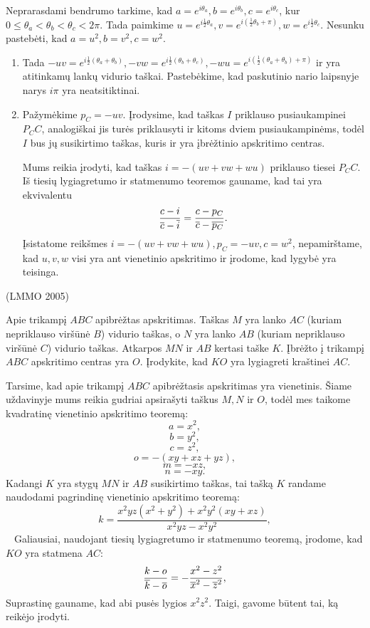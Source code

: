 \documentclass[11pt,a4paper,twoside]{book}
\begin{document}
\begin{sprendimas}
Neprarasdami bendrumo tarkime, kad $a=e^{i\theta_a}, b=e^{i\theta_b}, c=e^{i\theta_c}$, kur $0 \leq \theta_a < \theta_b < \theta_c < 2\pi$. Tada paimkime $u=e^{i\frac{1}{2}\theta_a}, v=e^{i(\frac{1}{2}\theta_b+\pi)}, w=e^{i\frac{1}{2}\theta_c}$. Nesunku pastebėti, kad $a=u^{2}, b=v^{2}, c=w^{2}$.

\begin{enumerate}
\item Tada $-uv=e^{i\frac{1}{2}(\theta_a+\theta_b)}, -vw=e^{i\frac{1}{2}(\theta_b+\theta_c)}, -wu=e^{i(\frac{1}{2}(\theta_a+\theta_b)+\pi)}$ ir yra atitinkamų lankų vidurio taškai. Pastebėkime, kad paskutinio nario laipsnyje narys $i\pi$ yra neatsitiktinai.
\item Pažymėkime $p_C=-uv$. Įrodysime, kad taškas $I$ priklauso pusiaukampinei $P_CC$, analogiškai jis turės priklausyti ir kitoms dviem pusiaukampinėms, todėl $I$ bus jų susikirtimo taškas, kuris ir yra įbrėžtinio apskritimo centras.

Mums reikia įrodyti, kad taškas $i=-(uv+vw+wu)$ priklauso tiesei $P_CC$. Iš tiesių lygiagretumo ir statmenumo teoremos gauname, kad tai yra ekvivalentu $$\frac{c-i}{\overline c - \overline i}=\frac{c-p_C}{\overline {c} - \overline {p_C}}.$$
Įsistatome reikšmes $i=-(uv+vw+wu), p_C=-uv, c=w^2$, nepamirštame, kad $u, v, w$ visi yra ant vienetinio apskritimo ir įrodome, kad lygybė yra teisinga.
\end{enumerate}
\end{sprendimas}






\begin{pavnr}
(LMMO 2005)

Apie trikampį $ABC$ apibrėžtas apskritimas. Taškas $M$ yra lanko $AC$ (kuriam nepriklauso viršūnė $B$) vidurio taškas, o $N$ yra lanko $AB$ (kuriam nepriklauso viršūnė $C$) vidurio taškas. Atkarpos $MN$ ir $AB$ kertasi taške $K$. Įbrėžto į trikampį $ABC$ apskritimo centras yra $O$. Įrodykite, kad $KO$ yra lygiagreti kraštinei $AC$. 
\end{pavnr}
\begin{sprendimas}
Tarsime, kad apie trikampį $ABC$ apibrėžtasis apskritimas yra vienetinis. Šiame uždavinyje mums reikia gudriai apsirašyti taškus $M, N$ ir $O$, todėl mes taikome kvadratinę vienetinio apskritimo teoremą:
$$a = x^2,$$
$$b=y^2,$$
$$c = z^2,$$
$$ o = - (xy+xz+yz),$$
$$m = - xz,$$
$$ n = - xy.$$
Kadangi $K$ yra stygų $MN$ ir $AB$ susikirtimo taškas, tai tašką $K$ randame naudodami pagrindinę vienetinio apskritimo teoremą:
$$k = \frac{ x^2yz(x^2+y^2)+ x^2 y^2 (xy+xz)}{ x^2 yz - x^2 y^2},$$
$\phantom{a}$ 
Galiausiai, naudojant tiesių lygiagretumo ir statmenumo teoremą, įrodome, kad $KO$ yra statmena $AC$:
$$\frac{k-o}{\overline k - \overline o}  = - \frac{ x^2 - z^2}{\overline x^2 - \overline z^2},$$
Suprastinę gauname, kad abi pusės lygios $x^2 z^2$. Taigi, gavome būtent tai, ką reikėjo įrodyti.
\end{sprendimas}
\end{document}
